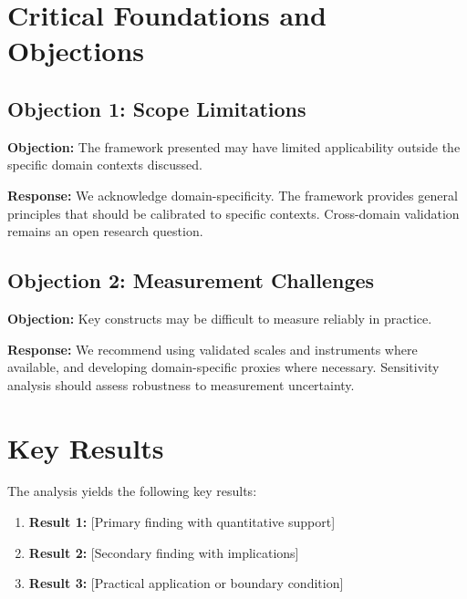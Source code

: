 \section{Critical Foundations and Objections}
\label{sec:lll-foundations}

\subsection{Objection 1: Scope Limitations}

\textbf{Objection:} The framework presented may have limited applicability
outside the specific domain contexts discussed.

\textbf{Response:} We acknowledge domain-specificity. The framework provides
general principles that should be calibrated to specific contexts. Cross-domain
validation remains an open research question.

\subsection{Objection 2: Measurement Challenges}

\textbf{Objection:} Key constructs may be difficult to measure reliably in
practice.

\textbf{Response:} We recommend using validated scales and instruments where
available, and developing domain-specific proxies where necessary. Sensitivity
analysis should assess robustness to measurement uncertainty.




\section{Key Results}
\label{sec:lll-results}

The analysis yields the following key results:

\begin{enumerate}
    \item \textbf{Result 1:} [Primary finding with quantitative support]
    \item \textbf{Result 2:} [Secondary finding with implications]
    \item \textbf{Result 3:} [Practical application or boundary condition]
\end{enumerate}


